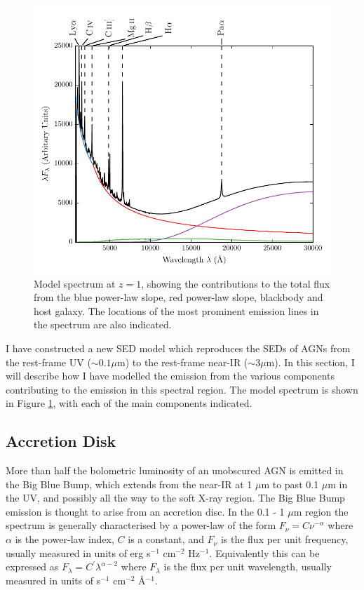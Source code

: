 \begin{figure}
  \centering
  \includegraphics[width=\textwidth]{figures/chapter06/sed_model.pdf}
  \caption{Model spectrum at $z=1$, showing the contributions to the total flux from the blue power-law slope, red power-law slope, blackbody and host galaxy. The locations of the most prominent emission lines in the spectrum are also indicated. }
  \label{fig:modelsed}
\end{figure}

I have constructed a new SED model which reproduces the SEDs of AGNs from the rest-frame UV ($\sim 0.1 \mu$m) to the rest-frame near-IR ($\sim 3 \mu$m). 
In this section, I will describe how I have modelled the emission from the various components contributing to the emission in this spectral region. 
The model spectrum is shown in Figure \ref{fig:modelsed}, with each of the main components indicated. 

\subsection{Accretion Disk}

More than half the bolometric luminosity of an unobscured AGN is emitted in the Big Blue Bump, which extends from the near-IR at 1 $\mu$m to past 0.1 $\mu$m in the UV, and possibly all the way to the soft X-ray region.
The Big Blue Bump emission is thought to arise from an accretion disc. 
In the 0.1 - 1 $\mu$m region the spectrum is generally characterised by a power-law of the form $F_\nu = C\nu^{-\alpha}$ where $\alpha$ is the power-law index, $C$ is a constant, and $F_\nu$ is the flux per unit frequency, usually measured in units of erg s$^{-1}$ cm$^{-2}$ Hz$^{-1}$. 
Equivalently this can be expressed as $F_\lambda = C^\prime\lambda^{\alpha - 2}$ where $F_\lambda$ is the flux per unit wavelength, usually measured in units of s$^{-1}$ cm$^{-2}$ \AA$^{-1}$. 

